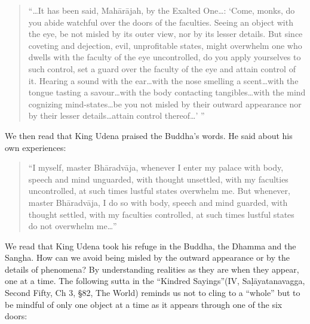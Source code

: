 \documentclass{book}
\begin{document}
\begin{quote}\begin{flushleft}
``\ldots It has been said, Mah{\=a}r{\=a}jah, by the Exalted One\ldots :
`Come, monks, do you abide watchful over the doors of the faculties.
Seeing an object with the eye, be not misled by its outer view, nor by
its lesser details. But since coveting and dejection, evil,
unprofitable states, might overwhelm one who dwells with the faculty of
the eye uncontrolled, do you apply yourselves to such control, set a
guard over the faculty of the eye and attain control of it. Hearing a
sound with the ear\ldots with the nose smelling a scent\ldots with the tongue
tasting a savour\ldots with the body contacting tangibles\ldots with the mind
cognizing mind-states\ldots be you not misled by their outward
appearance nor by their lesser details\ldots attain control thereof\ldots' '' 
\end{flushleft}\end{quote}




We then read that King Udena praised the Buddha's words. He said about
his own experiences:




\begin{quote}\begin{flushleft}
``I myself, master Bh{\=a}radv{\=a}ja, whenever I enter my palace with
body, speech and mind unguarded, with thought unsettled, with my
faculties uncontrolled, at such times lustful states overwhelm me.
But whenever, master Bh{\=a}radv{\=a}ja, I do so with body, speech and
mind guarded, with thought settled, with my faculties controlled, at
such times lustful states do not overwhelm me\ldots''
\end{flushleft}\end{quote}




We read that King Udena took his refuge in the Buddha, the Dhamma and
the Sangha. How can we avoid being misled by the outward appearance or by the
details of phenomena? By understanding realities as they are when they
appear, one at a time. The following sutta in the ``Kindred
Sayings''(IV, Sa\d l{\=a}yatanavagga, Second Fifty, Ch 3, {\S}82, The
World) reminds us not to cling to a ``whole'' but to be mindful of only
one object at a time as it appears through one of the six doors:
\end{document}
